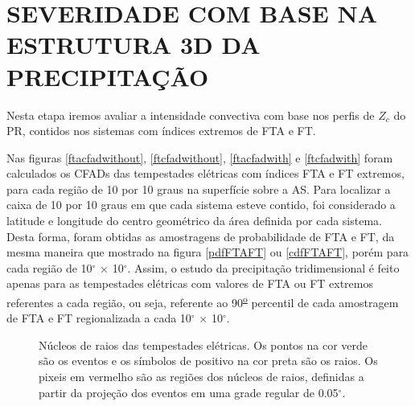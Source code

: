 \section{SEVERIDADE COM BASE NA ESTRUTURA 3D DA PRECIPITAÇÃO}

Nesta etapa iremos avaliar a intensidade convectiva com base nos perfis de $Z_c$ do PR, contidos nos sistemas com índices extremos de FTA e FT. 

Nas figuras \ref{ftacfadwithout}, \ref{ftcfadwithout},  \ref{ftacfadwith} e \ref{ftcfadwith} foram calculados os CFADs das tempestades elétricas com índices FTA e FT extremos, para cada região de 10 por 10 graus na superfície sobre a AS. Para localizar a caixa de 10 por 10 graus em que cada sistema esteve contido, foi considerado a latitude e longitude do centro geométrico da área definida por cada sistema. Desta forma, foram obtidas as amostragens de probabilidade de FTA e FT, da mesma maneira que mostrado na figura \ref{pdfFTAFT} ou \ref{cdfFTAFT}, porém para cada região de 10$^{\circ}$ $\times$ 10$^{\circ}$. Assim, o estudo da precipitação tridimensional é feito apenas para as tempestades elétricas com valores de FTA ou FT extremos referentes a cada região, ou seja, referente ao 90\textsuperscript{\underline{o}} percentil de cada  amostragem de FTA e FT regionalizada a cada 10$^{\circ}$ $\times$ 10$^{\circ}$.


\begin{figure}[!ht]
  \caption{Núcleos de raios das tempestades elétricas. Os pontos na cor  verde são os eventos e os símbolos de positivo na cor preta são os raios. Os pixeis em vermelho são as regiões dos núcleos de raios, definidas a partir da projeção dos eventos em uma grade regular de 0.05$^{\circ}$.} %
\label{nucleosRaios}
\end{figure}




